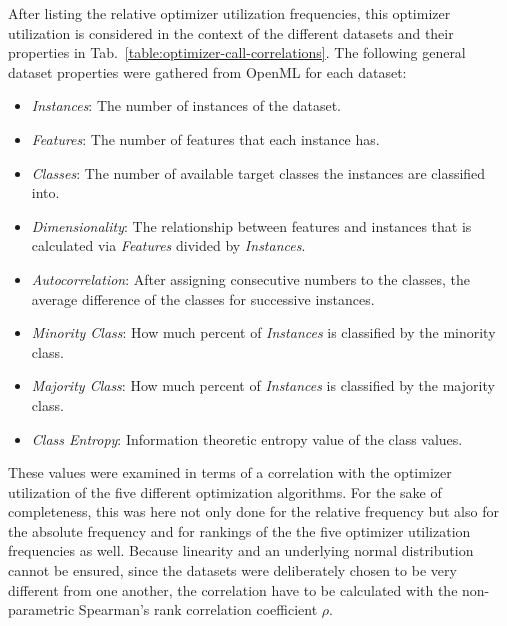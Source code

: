 After listing the relative optimizer utilization frequencies, this optimizer utilization is considered in the context of the different datasets and their properties in Tab.~\ref{table:optimizer-call-correlations}.
The following general dataset properties were gathered from OpenML for each dataset:
\begin{itemize}
    \item \textit{Instances}: The number of instances of the dataset.
    \item \textit{Features}: The number of features that each instance has.
    \item \textit{Classes}: The number of available target classes the instances are classified into.
    \item \textit{Dimensionality}: The relationship between features and instances that is calculated via \textit{Features} divided by \textit{Instances}.
    \item \textit{Autocorrelation}: After assigning consecutive numbers to the classes, the average difference of the classes for successive instances.
    \item \textit{Minority Class}: How much percent of \textit{Instances} is classified by the minority class.
    \item \textit{Majority Class}: How much percent of \textit{Instances} is classified by the majority class.
    \item \textit{Class Entropy}: Information theoretic entropy value of the class values.
\end{itemize}
These values were examined in terms of a correlation with the optimizer utilization of the five different optimization algorithms.
For the sake of completeness, this was here not only done for the relative frequency but also for the absolute frequency and for rankings of the the five optimizer utilization frequencies as well.\newline
Because linearity and an underlying normal distribution cannot be ensured, since the datasets were deliberately chosen to be very different from one another, the correlation have to be calculated with the non-parametric Spearman's rank correlation coefficient $\rho$.

